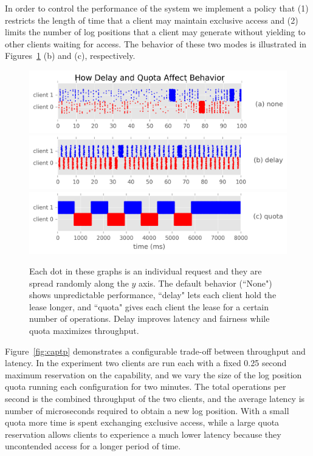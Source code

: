 \documentclass[preprint]{sigplanconf-eurosys}
\begin{document}
In order to control the performance of the system we implement a
policy that (1) restricts the length of time that a client may maintain
exclusive access and (2) limits the number of log positions that a client may
generate without yielding to other clients waiting for access. The behavior of
these two modes is illustrated in Figures~\ref{fig:capdelay-quota-behavior}
(b) and (c), respectively.

\begin{figure}[h]
\centering
\includegraphics{figures/capdelay-quota-behavior-a.png}
\includegraphics{figures/capdelay-quota-behavior-b.png}
\includegraphics{figures/capdelay-quota-behavior-c.png}
\caption{Each dot in these graphs is an individual request and they are spread
randomly along the \(y\) axis. The default behavior (``None") shows
unpredictable performance, ``delay" lets each client hold the lease longer, and
``quota" gives each client the lease for a certain number of operations. Delay
improves latency and fairness while quota maximizes throughput.}
\label{fig:capdelay-quota-behavior}
\end{figure}

Figure~\ref{fig:captp} demonstrates a configurable trade-off between
throughput and latency. In the experiment two clients are run each with a
fixed 0.25 second maximum reservation on the capability, and we vary the size
of the log position quota running each configuration for two minutes. The
total operations per second is the combined throughput of the two clients, and
the average latency is number of microseconds required to obtain a new log
position. With a small quota more time is spent exchanging exclusive access,
while a large quota reservation allows clients to experience a much lower
latency because they uncontended access for a longer period of time.
\end{document}
